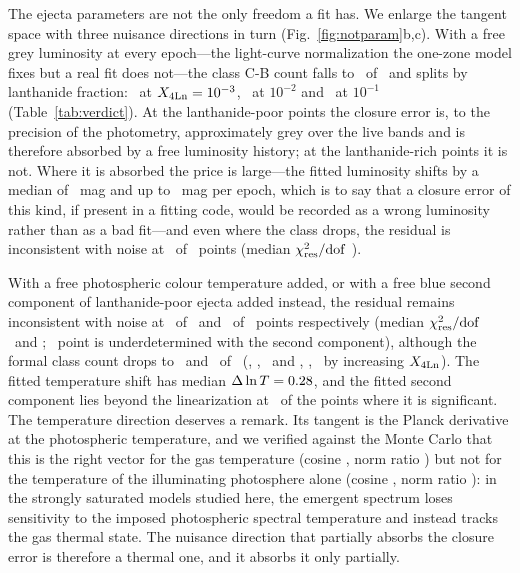 \documentclass[11pt]{article}
\newcommand{\Xlan}{X_{\rm 4Ln}}
\newcommand{\chires}{\chi^2_{\rm res}/{\rm dof}}
\begin{document}
The ejecta parameters are not the only freedom a fit has. We enlarge the tangent space with three nuisance directions in turn (Fig.~\ref{fig:notparam}b,c). With a free grey luminosity at every epoch---the light-curve normalization the one-zone model fixes but a real fit does not---the class C-B count falls to \TOneCB\ of \nPoints\ and splits by lanthanide fraction: \TOneCBXlow\ at $\Xlan=10^{-3}$, \TOneCBXmid\ at $10^{-2}$ and \TOneCBXhigh\ at $10^{-1}$ (Table~\ref{tab:verdict}). At the lanthanide-poor points the closure error is, to the precision of the photometry, approximately grey over the live bands and is therefore absorbed by a free luminosity history; at the lanthanide-rich points it is not. Where it is absorbed the price is large---the fitted luminosity shifts by a median of \TOneALMedian\ mag and up to \TOneALMax\ mag per epoch, which is to say that a closure error of this kind, if present in a fitting code, would be recorded as a wrong luminosity rather than as a bad fit---and even where the class drops, the residual is inconsistent with noise at \TOneLeftover\ of \TOneDetermined\ points (median $\chires$ \TOneMedianChi).

With a free photospheric colour temperature added, or with a free blue second component of lanthanide-poor ejecta added instead, the residual remains inconsistent with noise at \TTwoLeftover\ of \TTwoDetermined\ and \TThreeLeftover\ of \TThreeDetermined\ points respectively (median $\chires$ \TTwoMedianChi\ and \TThreeMedianChi; \TThreeUnderdetermined\ point is underdetermined with the second component), although the formal class count drops to \TTwoCB\ and \TThreeCB\ of \nPoints\ (\TTwoCBXlow, \TTwoCBXmid, \TTwoCBXhigh\ and \TThreeCBXlow, \TThreeCBXmid, \TThreeCBXhigh\ by increasing $\Xlan$). The fitted temperature shift has median $\Delta\ln T=0.28$, and the fitted second component lies beyond the linearization at \TThreeBeyondLinear\ of the points where it is significant. The temperature direction deserves a remark. Its tangent is the Planck derivative at the photospheric temperature, and we verified against the Monte Carlo that this is the right vector for the gas temperature (cosine \GasCos, norm ratio \GasNorm) but not for the temperature of the illuminating photosphere alone (cosine \IllumCos, norm ratio \IllumNorm): in the strongly saturated models studied here, the emergent spectrum loses sensitivity to the imposed photospheric spectral temperature and instead tracks the gas thermal state. The nuisance direction that partially absorbs the closure error is therefore a thermal one, and it absorbs it only partially.
\end{document}
